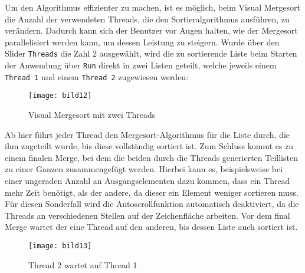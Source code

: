 Um den Algorithmus effizienter zu machen, ist es möglich, beim Visual Mergesort die Anzahl der verwendeten Threads, die den Sortieralgorithmus ausführen, zu verändern. Dadurch kann sich der Benutzer vor Augen halten, wie der Mergesort parallelisiert werden kann, um dessen Leistung zu steigern. Wurde über den Slider \texttt{Threads} die Zahl 2 ausgewählt, wird die zu sortierende Liste beim Starten der Anwendung über \texttt{Run} direkt in zwei Listen geteilt, welche jeweils einem \texttt{Thread 1} und einem \texttt{Thread 2} zugewiesen werden:

\begin{figure}[!htb]
    \centering
      \texttt{[image: bild12]}
    \caption{Visual Mergesort mit zwei Threads}
\end{figure}

Ab hier führt jeder Thread den Mergesort-Algorithmus für die Liste durch, die ihm zugeteilt wurde, bis diese vollständig sortiert ist. Zum Schluss kommt es zu einem finalen Merge, bei dem die beiden durch die Threads generierten Teillisten zu einer Ganzen zusammengefügt werden. Hierbei kann es, beispielsweise bei einer ungeraden Anzahl an Ausgangselementen dazu kommen, dass ein Thread mehr Zeit benötigt, als der andere, da dieser ein Element weniger sortieren muss. Für diesen Sonderfall wird die Autoscrollfunktion automatisch deaktiviert, da die Threads an verschiedenen Stellen auf der Zeichenfläche arbeiten. Vor dem final Merge wartet der eine Thread auf den anderen, bis dessen Liste auch sortiert ist.

\begin{figure}[!htb]
    \centering
      \texttt{[image: bild13]}
    \caption{Thread 2 wartet auf Thread 1}
\end{figure}
